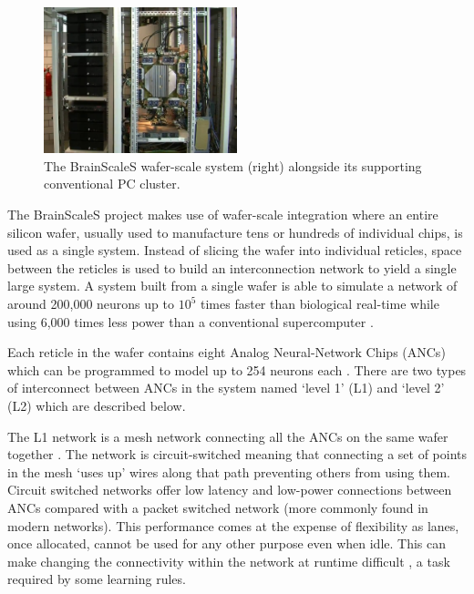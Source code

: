 				\begin{figure}
					\center
					\includegraphics[width=0.5\textwidth]{figures/brainscales}
					
					\caption[The BrainScaleS wafer-scale system.]{The BrainScaleS
					wafer-scale system (right) alongside its supporting conventional PC cluster.}
					
					\label{fig:brainscales}
				\end{figure}
				
				The BrainScaleS project makes use of wafer-scale integration where an
				entire silicon wafer, usually used to manufacture tens or hundreds of
				individual chips, is used as a single system. Instead of slicing the
				wafer into individual reticles, space between the reticles is used to
				build an interconnection network to yield a single large system. A
				system built from a single wafer is able to simulate a network of around
				200,000 neurons up to $10^5$ times faster than biological real-time
				while using 6,000 times less power than a conventional supercomputer
				\cite{schemmel08}.
				
				Each reticle in the wafer contains eight Analog Neural-Network Chips
				(ANCs) which can be programmed to model up to 254 neurons each
				\cite{schemmel10}. There are two types of interconnect between ANCs in
				the system named `level 1' (L1) and `level 2' (L2) which are described
				below.
			
				The L1 network is a mesh network connecting all the ANCs on the same
				wafer together \cite{fieres08}. The network is circuit-switched meaning
				that connecting a set of points in the mesh `uses up' wires along that
				path preventing others from using them. Circuit switched networks offer
				low latency and low-power connections between ANCs compared with a
				packet switched network (more commonly found in modern networks). This
				performance comes at the expense of flexibility as lanes, once
				allocated, cannot be used for any other purpose even when idle. This can
				make changing the connectivity within the network at runtime difficult
				\cite{dally04}, a task required by some learning rules.
				
